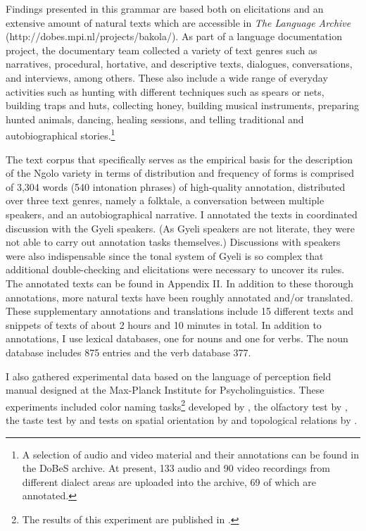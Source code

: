 Findings presented in this grammar are based both on elicitations and an extensive amount of natural texts which are accessible in {\itshape The Language Archive} (http://dobes.mpi.nl/projects/bakola/). As part of a language documentation project, the documentary team collected a variety of text genres such as narratives, procedural, hortative, and descriptive texts, dialogues, conversations, and interviews, among others. These also include a wide range of everyday activities such as hunting with different techniques such as spears or nets, building traps and huts, collecting honey, building musical instruments, preparing hunted animals, dancing, healing sessions, and telling traditional and autobiographical stories.\footnote{A selection of audio and video material and their annotations can be found in the DoBeS archive. At present, 133 audio and 90 video recordings from different dialect areas are uploaded into the archive, 69 of which are annotated.}

The text corpus that specifically serves as the empirical basis for the description of the Ngolo variety in terms of distribution and frequency of forms is comprised of 3,304 words (540 intonation phrases) of high-quality annotation, distributed over three text genres, namely a folktale, a conversation between multiple speakers, and an autobiographical narrative. I annotated the texts in coordinated discussion with the Gyeli speakers. (As Gyeli speakers are not literate, they were not able to carry out annotation tasks themselves.) Discussions with speakers were also indispensable since the tonal system of Gyeli is so complex that additional double-checking and elicitations were necessary to uncover its rules. The annotated texts can be found in  Appendix II. In addition to these thorough annotations, more natural texts have been roughly annotated and/or translated. These supplementary annotations and translations include 15 different texts and snippets of texts of about 2 hours and 10 minutes in total. In addition to annotations, I use lexical databases, one for nouns and one for verbs. The noun database includes 875 entries and the verb database 377.

I also gathered experimental data based on the language of perception field manual designed at the Max-Planck Institute for Psycholinguistics. These experiments included color naming tasks\footnote{The results of this experiment are published in \citet{grimm2014}.} developed by \citet{majid2007a}, the olfactory test by \citet{majid2007b}, the taste test by \citet{senft2007} and tests on spatial orientation by \citet{levinson93} and topological relations by \citet{bowerman92}. 

